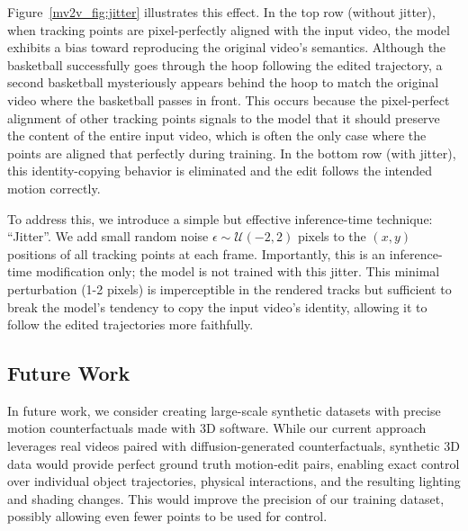 Figure~\ref{mv2v_fig:jitter} illustrates this effect. In the top row (without jitter), when tracking points are pixel-perfectly aligned with the input video, the model exhibits a bias toward reproducing the original video's semantics. Although the basketball successfully goes through the hoop following the edited trajectory, a second basketball mysteriously appears behind the hoop to match the original video where the basketball passes in front. This occurs because the pixel-perfect alignment of other tracking points signals to the model that it should preserve the content of the entire input video, which is often the only case where the points are aligned that perfectly during training. In the bottom row (with jitter), this identity-copying behavior is eliminated and the edit follows the intended motion correctly.

To address this, we introduce a simple but effective inference-time technique: ``Jitter''. We add small random noise $\epsilon \sim \mathcal{U}(-2, 2)$ pixels to the $(x, y)$ positions of all tracking points at each frame. Importantly, this is an inference-time modification only; the model is not trained with this jitter. This minimal perturbation (1-2 pixels) is imperceptible in the rendered tracks but sufficient to break the model's tendency to copy the input video's identity, allowing it to follow the edited trajectories more faithfully.


\subsection{Future Work}

In future work, we consider creating large-scale synthetic datasets with precise motion counterfactuals made with 3D software. While our current approach leverages real videos paired with diffusion-generated counterfactuals, synthetic 3D data would provide perfect ground truth motion-edit pairs, enabling exact control over individual object trajectories, physical interactions, and the resulting lighting and shading changes. This would improve the precision of our training dataset, possibly allowing even fewer points to be used for control.
